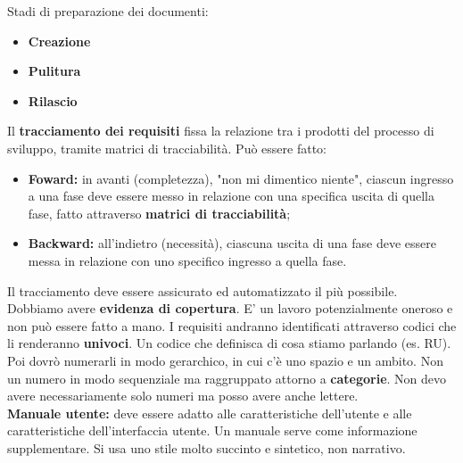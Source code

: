 Stadi di preparazione dei documenti:

\begin{itemize}

	\item \textbf{Creazione}
	\item \textbf{Pulitura}
	\item \textbf{Rilascio}

\end{itemize}

Il \textbf{tracciamento dei requisiti}  fissa la relazione tra i prodotti del processo di sviluppo, tramite matrici di tracciabilità. Può essere fatto:

\begin{itemize}

	\item \textbf{Foward:} in avanti (completezza), "non mi dimentico niente", ciascun ingresso a una fase deve essere messo in relazione con una specifica uscita di quella fase, fatto attraverso \textbf{matrici di tracciabilità};
	\item \textbf{Backward:} all'indietro (necessità), ciascuna uscita di una fase deve essere messa in relazione con uno specifico ingresso a quella fase.
\end{itemize}




Il tracciamento deve essere assicurato ed automatizzato il più possibile. Dobbiamo avere \textbf{evidenza di copertura}. E' un lavoro potenzialmente oneroso e non può essere fatto a mano. I requisiti andranno identificati attraverso codici che li renderanno \textbf{univoci}. Un codice che definisca di cosa stiamo parlando (es. RU). Poi dovrò numerarli in modo gerarchico, in cui c'è uno spazio e un ambito. Non un numero in modo sequenziale ma raggruppato attorno a \textbf{categorie}. Non devo avere necessariamente solo numeri ma posso avere anche lettere.\\

\textbf{Manuale utente:} deve essere adatto alle caratteristiche dell'utente e alle caratteristiche dell'interfaccia utente. Un manuale serve come informazione supplementare. Si usa uno stile molto succinto e sintetico, non narrativo. \\

